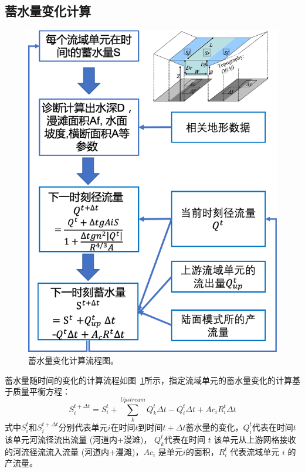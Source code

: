 \subsection{蓄水量变化计算}
{
\begin{figure}[]
\centering
\includegraphics{Figures/陆地表面的水分循环/蓄水量变化计算流程图.png}
\caption{蓄水量变化计算流程图。 }
\label{fig:蓄水量变化计算流程图}
\end{figure}
}
蓄水量随时间的变化的计算流程如图~\ref{fig:蓄水量变化计算流程图}所示，指定流域单元的蓄水量变化的计算基于质量平衡方程：
\begin{equation}
S_{i}^{t+\Delta t}=S_{i}^{t}+\sum_{k}^{Upstream} Q_{k}^{t} \Delta t-Q_{i}^{t} \Delta t+A c_{i} R_{i}^{t} \Delta t
\end{equation}
式中$S_{i}^{t}$和$S_{i}^{t+\Delta t}$分别代表单元$i$在时间$t$到时间$t+\Delta t$蓄水量的变化，$Q_i^t$代表在时间$t$该单元河流径流出流量 (河道内+漫滩)，
$Q_k^t$代表在时间 $t$ 该单元从上游网格接收的河流径流流入流量 (河道内+漫滩)，$Ac_i$ 是单元$i$的面积，$R_i^t$ 代表流域单元 $i$ 的产流量。

